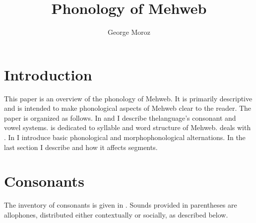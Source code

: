\documentclass[output=paper]{langsci/langscibook}
\title{Phonology of Mehweb}
\author{George Moroz\affiliation{Linguistic Convergence Laboratory, National Research University Higher School of Economics}} %
\begin{document}
\maketitle

\section{Introduction}



This paper is an overview of the phonology of
Mehweb. It is primarily descriptive and is intended to make phonological
aspects of Mehweb clear to the reader. The paper is organized as
follows. In  and  I describe ​the​​ language's consonant and vowel systems.
 is dedicated to syllable and word structure of Mehweb.
 deals with . In  I introduce basic phonological and
morphophonological alternations. In the last section I describe
 and how it affects segments.



\section{Consonants}\label{consonants}

The inventory of consonants is given in . Sounds provided in
parentheses are allophones, distributed either contextually or socially,
as described below.

\pagebreak
\end{document}
